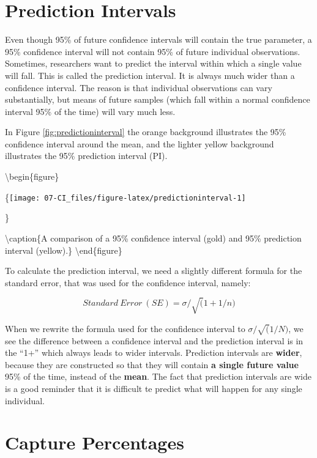 \documentclass[
  oneside]{book}
\begin{document}
\hypertarget{prediction-intervals}{%
\section{Prediction Intervals}\label{prediction-intervals}}

Even though 95\% of future confidence intervals will contain the true parameter, a 95\% confidence interval will not contain 95\% of future individual observations. Sometimes, researchers want to predict the interval within which a single value will fall. This is called the prediction interval. It is always much wider than a confidence interval. The reason is that individual observations can vary substantially, but means of future samples (which fall within a normal confidence interval 95\% of the time) will vary much less.

In Figure \ref{fig:predictioninterval} the orange background illustrates the 95\% confidence interval around the mean, and the lighter yellow background illustrates the 95\% prediction interval (PI).

\textbackslash begin\{figure\}

\{\centering \texttt{[image: 07-CI\_files/figure-latex/predictioninterval-1]}

\}

\textbackslash caption\{A comparison of a 95\% confidence interval (gold) and 95\% prediction interval (yellow).\}\label{fig:predictioninterval}
\textbackslash end\{figure\}

To calculate the prediction interval, we need a slightly different formula for the standard error, that was used for the confidence interval, namely:

\[
Standard \ Error \ (SE) = \sigma/\sqrt(1+1/n)
\]

When we rewrite the formula used for the confidence interval to \(\sigma/\sqrt(1/N)\), we see the difference between a confidence interval and the prediction interval is in the ``1+'' which always leads to wider intervals. Prediction intervals are \textbf{wider}, because they are constructed so that they will contain \textbf{a single future value} 95\% of the time, instead of the \textbf{mean}. The fact that prediction intervals are wide is a good reminder that it is difficult te predict what will happen for any single individual.

\hypertarget{capture-percentages}{%
\section{Capture Percentages}\label{capture-percentages}}
\end{document}

